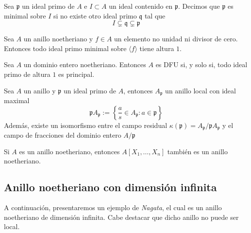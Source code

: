     \begin{definition}
        Sea $\mathfrak{p}$ un ideal primo de $A$ e $I\subset A$ un ideal contenido en $\mathfrak{p}$. Decimos que $\mathfrak{p}$ es minimal sobre $I$ si no existe otro ideal primo $\mathfrak{q}$ tal que
        \begin{equation*}
            I\subsetneq \mathfrak{q}\subsetneq \mathfrak{p}
        \end{equation*}
    \end{definition}
    
    \begin{theorem}\label{principalkrull}
        Sea $A$ un anillo noetheriano y $f\in A$ un elemento no unidad ni divisor de cero. Entonces todo ideal primo minimal sobre $\langle f \rangle$ tiene altura $1$.
    \end{theorem}

    \begin{propo}\label{dfuprincipal}
        Sea $A$ un dominio entero noetheriano. Entonces $A$ es DFU si, y solo si, todo ideal primo de altura $1$ es principal.
    \end{propo}

    \begin{lemma}\label{lemaisoresidual}
        Sea $A$ un anillo y $\mathfrak{p}$ un ideal primo de $A$, entonces $A_\mathfrak{p}$ un anillo local con ideal maximal
        \begin{equation*}
            \mathfrak{p}A_\mathfrak{p}:=\left\{\frac{a}{s}\in A_\mathfrak{p}:a\in \mathfrak{p}\right\}
        \end{equation*}
        Además, existe un isomorfismo entre el campo residual $\kappa(\mathfrak{p})=A_\mathfrak{p}/\mathfrak{p}A_\mathfrak{p}$ y el campo de fracciones del dominio entero $A/\mathfrak{p}$
    \end{lemma}

    \begin{theorem}\label{basehilbert}
    	Si $A$ es un anillo noetheriano, entonces $A[X_1,\dots, X_n]$ también es un anillo noetheriano.
    \end{theorem}
    
    \subsection{Anillo noetheriano con dimensión infinita}
    
    A continuación, presentaremos un ejemplo de \textit{Nagata}, el cual es un anillo noetheriano de dimensión infinita. Cabe destacar que dicho anillo no puede ser local.
    
